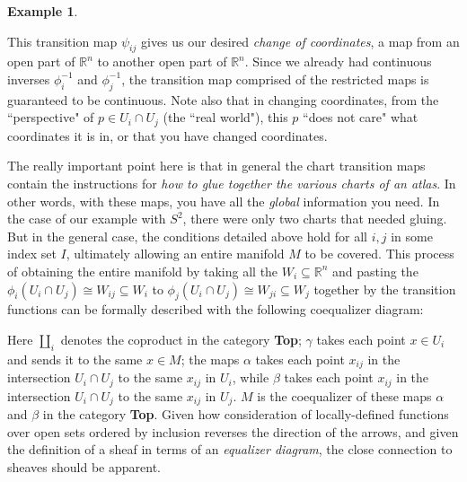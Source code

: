 \documentclass[a4paper]{book}
\theoremstyle{definition}
\newtheorem{example}{Example}[section]
\theoremstyle{definition}
\theoremstyle{definition}
\theoremstyle{theorem}
\theoremstyle{definition}
\begin{document}
\begin{example}
\begin{center}
	\end{center} 
	This transition map $\psi_{ij}$ gives us our desired \textit{change of coordinates}, a map from an open part of $\mathbb{R}^n$ to another open part of $\mathbb{R}^n$. Since we already had continuous inverses $\phi_i^{-1}$ and $\phi_j^{-1}$, the transition map comprised of the restricted maps is guaranteed to be continuous. Note also that in changing coordinates, from the ``perspective" of $p \in U_i \cap U_j$ (the ``real world"), this $p$ ``does not care" what coordinates it is in, or that you have changed coordinates.\par
	The really important point here is that in general the chart transition maps contain the instructions for \textit{how to glue together the various charts of an atlas}. In other words, with these maps, you have all the \textit{global} information you need. In the case of our example with $S^2$, there were only two charts that needed gluing. But in the general case, the conditions detailed above hold for all $i,j$ in some index set $I$, ultimately allowing an entire manifold $M$ to be covered. This process of obtaining the entire manifold by taking all the $W_i \subseteq \mathbb{R}^n$ and pasting the $\phi_i(U_i \cap U_j) \cong W_{ij} \subseteq W_i$ to $\phi_j(U_i \cap U_j) \cong W_{ji} \subseteq W_j$ together by the transition functions can be formally described with the following coequalizer diagram: 
	\begin{center}
	\end{center} 
	Here $\coprod_i$ denotes the coproduct in the category \textbf{Top}; $\gamma$ takes each point $x \in U_i$ and sends it to the same $x \in M$; the maps $\alpha$ takes each point $x_{ij}$ in the intersection $U_i \cap U_j$ to the same $x_{ij}$ in $U_i$, while $\beta$ takes each point $x_{ij}$ in the intersection $U_i \cap U_j$ to the same $x_{ij}$ in $U_j$. $M$ is the coequalizer of these maps $\alpha$ and $\beta$ in the category \textbf{Top}. Given how consideration of locally-defined functions over open sets ordered by inclusion reverses the direction of the arrows, and given the definition of a sheaf in terms of an \textit{equalizer diagram}, the close connection to sheaves should be apparent.\par 

\end{example}
\end{document}
